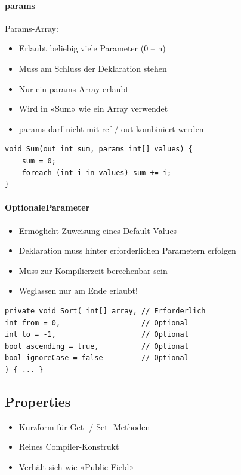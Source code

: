 \paragraph{params}
Params-Array:
\begin{itemize}
    \item Erlaubt beliebig viele Parameter (0 – n)
    \item Muss am Schluss der Deklaration stehen
    \item Nur ein params-Array erlaubt
    \item Wird in «Sum» wie ein Array verwendet
    \item params darf nicht mit ref / out kombiniert werden
\end{itemize}
\begin{lstlisting}
void Sum(out int sum, params int[] values) {
    sum = 0;
    foreach (int i in values) sum += i;
}
\end{lstlisting}

\paragraph{OptionaleParameter}
\begin{itemize}
    \item Ermöglicht Zuweisung eines Default-Values
    \item Deklaration muss hinter erforderlichen Parametern erfolgen
    \item Muss zur Kompilierzeit berechenbar sein
    \item Weglassen nur am Ende erlaubt!
\end{itemize}
\begin{lstlisting}
private void Sort( int[] array, // Erforderlich
int from = 0,                   // Optional
int to = -1,                    // Optional
bool ascending = true,          // Optional
bool ignoreCase = false         // Optional
) { ... }
\end{lstlisting}


\subsection{Properties}
\begin{itemize}
    \item Kurzform für Get- / Set- Methoden
    \item Reines Compiler-Konstrukt
    \item Verhält sich wie «Public Field»
\end{itemize}

